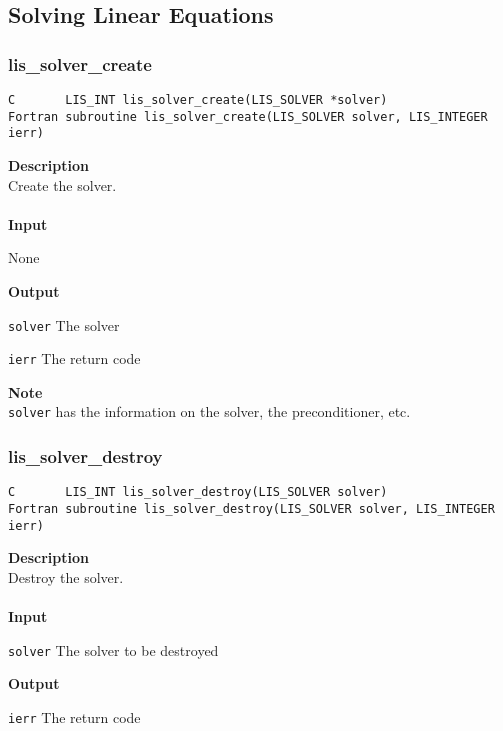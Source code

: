 \documentclass[a4paper]{article}
\newcommand{\namelistlabel}[1]{\mbox{#1}\hfill}
\newenvironment{namelist}[1]{%
\begin{list}{}
  {\let\makelabel\namelistlabel
  \settowidth{\labelwidth}{#1}
  \setlength{\leftmargin}{1.1\labelwidth}}
  }{%
\end{list}}
\begin{document}
\newpage
\subsection{Solving Linear Equations}
\subsubsection{lis\_solver\_create}
\begin{screen}
\verb|C       LIS_INT lis_solver_create(LIS_SOLVER *solver)|\\
\verb|Fortran subroutine lis_solver_create(LIS_SOLVER solver, LIS_INTEGER ierr)|
\end{screen}
{\bf Description}\\
\indent
Create the solver.
\\ \\
\noindent
{\bf Input}
\begin{namelist}{XXXXXXXXXXXXXXXXXXXX}
\item[None]
\end{namelist}
{\bf Output}
\begin{namelist}{XXXXXXXXXXXXXXXXXXXX}
\item[\tt solver] The solver
\item[\tt ierr] The return code
\end{namelist}
{\bf Note}\\
\indent
\verb|solver| has the information on the solver, the preconditioner, etc.

\subsubsection{lis\_solver\_destroy}
\begin{screen}
\verb|C       LIS_INT lis_solver_destroy(LIS_SOLVER solver)|\\
\verb|Fortran subroutine lis_solver_destroy(LIS_SOLVER solver, LIS_INTEGER ierr)|
\end{screen}
{\bf Description}\\
\indent
Destroy the solver.
\\ \\
\noindent
{\bf Input}
\begin{namelist}{XXXXXXXXXXXXXXXXXXXX}
\item[\tt solver] The solver to be destroyed
\end{namelist}
{\bf Output}
\begin{namelist}{XXXXXXXXXXXXXXXXXXXX}
\item[\tt ierr] The return code
\end{namelist}
\end{document}
